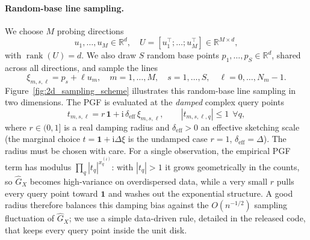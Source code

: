 \documentclass[sigconf,natbib=true,anonymous=true,review=true]{acmart}
\newcommand{\R}{\mathbb{R}}
\newcommand{\jj}{\mathrm{i}}
\newcommand{\deff}{\delta_{\mathrm{eff}}}
\begin{document}
\paragraph{Random-base line sampling.}
We choose $M$ probing directions
\[
    u_1,\ldots,u_M \in \R^d,
    \quad
    U = [u_1^\top;\ldots;u_M^\top]\in\R^{M\times d},
\]
with $\operatorname{rank}(U)=d$. We also draw $S$ random base points
$p_1,\ldots,p_S\in\R^d$, shared across all directions, and sample the lines
\begin{equation}
    \xi_{m,s,\ell}
    =
    p_s+\ell u_m,
    \quad
    m=1,\ldots,M,\quad
    s=1,\ldots,S,\quad
    \ell=0,\ldots,N_m-1.
    \label{eq:line_sampling}
\end{equation}
Figure~\ref{fig:2d_sampling_scheme} illustrates this random-base line sampling in two
dimensions. The PGF is evaluated at the \emph{damped} complex query points
\begin{equation}
    t_{m,s,\ell}
    =
    r\,\mathbf{1}+\jj\,\deff\, \xi_{m,s,\ell},
    \qquad
    |t_{m,s,\ell,q}|\le 1
    \ \ \forall q,
    \label{eq:pgf_queries}
\end{equation}
where $r\in(0,1]$ is a real damping radius and $\deff>0$ an effective sketching scale
(the marginal choice $t=\mathbf{1}+\jj\Delta\xi$ is the undamped case $r=1$, $\deff=\Delta$).
The radius must be chosen with care. For a single observation, the empirical PGF term
has modulus $\prod_q|t_q|^{x_q^{(i)}}$: with $|t_q|>1$ it grows geometrically in the
counts, so $\widehat G_X$ becomes high-variance on overdispersed data, while a very small
$r$ pulls every query point toward $\mathbf{1}$ and washes out the exponential structure.
A good radius therefore balances this damping bias against the $O(n^{-1/2})$ sampling
fluctuation of $\widehat G_X$; we use a simple data-driven rule, detailed in the released
code, that keeps every query point inside the unit disk.
\end{document}
